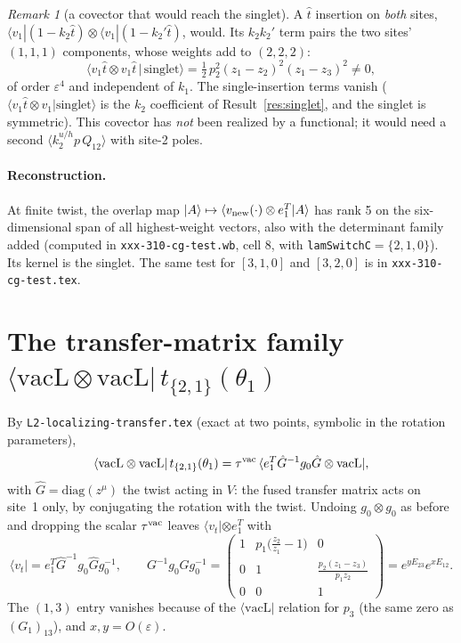 \documentclass[11pt]{article}
\newcommand{\vacL}{\langle\mathrm{vacL}|}
\newcommand{\nb}[1]{\texttt{#1}}
\theoremstyle{definition}
\theoremstyle{remark}
\newtheorem*{remark}{Remark}
\begin{document}
\begin{remark}[a covector that would reach the singlet]
A $\hat t$ insertion on \emph{both} sites, $\langle v_1|(1-k_2\hat t)\otimes\langle v_1|(1-k_2'\hat t)$, would. Its $k_2k_2'$ term pairs the two sites' $(1,1,1)$ components, whose weights add to $(2,2,2)$:
\begin{equation}
\langle v_1\hat t\otimes v_1\hat t\,|\,\text{singlet}\rangle=\tfrac12\,p_2^2(z_1-z_2)^2(z_1-z_3)^2\neq0,
\end{equation}
of order $\varepsilon^4$ and independent of $k_1$. The single-insertion terms vanish ($\langle v_1\hat t\otimes v_1|\text{singlet}\rangle$ is the $k_2$ coefficient of Result~\ref{res:singlet}, and the singlet is symmetric). This covector has \emph{not} been realized by a functional; it would need a second $\langle k_2^{u/h}p\,Q_{12}\rangle$ with site-2 poles.
\end{remark}

\paragraph{Reconstruction.}
At finite twist, the overlap map $|A\rangle\mapsto\langle v_{\rm new}(\cdot)\otimes e_1^T|A\rangle$ has rank 5 on the six-dimensional span of all highest-weight vectors, also with the determinant family added (computed in \nb{xxx-310-cg-test.wb}, cell 8, with \nb{lamSwitchC}$=\{2,1,0\}$). Its kernel is the singlet. The same test for $[3,1,0]$ and $[3,2,0]$ is in \nb{xxx-310-cg-test.tex}.

\section{The transfer-matrix family $\langle\mathrm{vacL}\otimes\mathrm{vacL}|\,t_{\{2,1\}}(\theta_1)$}\label{sec:t21}

By \nb{L2-localizing-transfer.tex} (exact at two points, symbolic in the rotation parameters),
\begin{equation}
\langle\mathrm{vacL}\otimes\mathrm{vacL}|\,t_{\{2,1\}}(\theta_1)=\tau^{\rm vac}\,\langle e_1^T\hat G^{-1}g_0\hat G\otimes\mathrm{vacL}|,
\end{equation}
with $\hat G=\mathrm{diag}(z^\mu)$ the twist acting in $V$: the fused transfer matrix acts on site~1 only, by conjugating the rotation with the twist. Undoing $g_0\otimes g_0$ as before and dropping the scalar $\tau^{\rm vac}$ leaves $\langle v_t|\otimes e_1^T$ with
\begin{equation}
\langle v_t|=e_1^T\hat G^{-1}g_0\hat Gg_0^{-1},\qquad
G^{-1}g_0Gg_0^{-1}=\begin{pmatrix}1& p_1\big(\tfrac{z_2}{z_1}-1\big)&0\\0&1&\tfrac{p_2(z_1-z_3)}{p_1z_2}\\0&0&1\end{pmatrix}=e^{yE_{23}}e^{xE_{12}} .
\end{equation}
The $(1,3)$ entry vanishes because of the $\vacL$ relation for $p_3$ (the same zero as $(G_1)_{13}$), and $x,y=O(\varepsilon)$.
\end{document}
